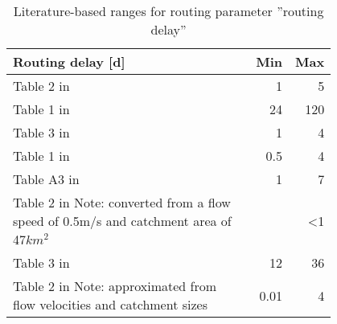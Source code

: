 \begin{table}[htbp]
  \centering
  \caption[References: Routing delay]{Literature-based ranges for routing parameter ''routing delay''}
    \begin{tabular}{p{0.8\linewidth}rr}
    \toprule
    \textbf{Routing delay [d]} & \textbf{Min} & \textbf{Max} \\
    \midrule
    Table 2 in \cite{Seibert1997} & 1     & 5 \\
    Table 1 in \cite{Kollat2012} & 24    & 120 \\
    Table 3 in \cite{Liden2000} & 1     & 4 \\
    Table 1 in \cite{Perrin2003} & 0.5   & 4 \\
    Table A3 in \cite{Seibert2012} & 1     & 7 \\
    Table 2 in \cite{Atkinson2003} Note: converted from a flow speed of 0.5m/s and catchment area of 47$km^2$ &       & <1 \\
    Table 3 in \cite{Goswami2010} & 12    & 36 \\
    Table 2 in \cite{Vinogradov2011} Note: approximated from flow velocities and catchment sizes & 0.01  & 4 \\
    \bottomrule
    \end{tabular}%
  \label{tab:sm4_rout}%
\end{table}%

\clearpage



























